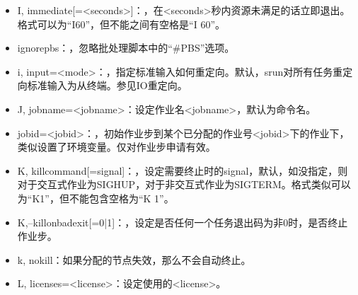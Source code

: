 \documentclass[a4paper,12pt,english]{sphinxmanual}
\begin{document}
\begin{itemize}
\begin{itemize}
\end{itemize}

\item {} 
\sphinxAtStartPar
\sphinxhyphen{}I, \sphinxhyphen{}\sphinxhyphen{}immediate{[}=<seconds>{]}：，在<seconds>秒内资源未满足的话立即退出。格式可以为“\sphinxhyphen{}I60”，但不能之间有空格是“\sphinxhyphen{}I 60”。

\item {} 
\sphinxAtStartPar
\sphinxhyphen{}\sphinxhyphen{}ignore\sphinxhyphen{}pbs：，忽略批处理脚本中的“\#PBS”选项。

\item {} 
\sphinxAtStartPar
\sphinxhyphen{}i, \sphinxhyphen{}\sphinxhyphen{}input=<mode>：，指定标准输入如何重定向。默认，srun对所有任务重定向标准输入为从终端。参见IO重定向。

\item {} 
\sphinxAtStartPar
\sphinxhyphen{}J, \sphinxhyphen{}\sphinxhyphen{}job\sphinxhyphen{}name=<jobname>：设定作业名<jobname>，默认为命令名。

\item {} 
\sphinxAtStartPar
\sphinxhyphen{}\sphinxhyphen{}jobid=<jobid>：，初始作业步到某个已分配的作业号<jobid>下的作业下，类似设置了环境变量。仅对作业步申请有效。

\item {} 
\sphinxAtStartPar
\sphinxhyphen{}K, \sphinxhyphen{}\sphinxhyphen{}kill\sphinxhyphen{}command{[}=signal{]}：，设定需要终止时的signal，默认，如没指定，则对于交互式作业为SIGHUP，对于非交互式作业为SIGTERM。格式类似可以为“\sphinxhyphen{}K1”，但不能包含空格为“\sphinxhyphen{}K 1”。

\item {} 
\sphinxAtStartPar
\sphinxhyphen{}K,–kill\sphinxhyphen{}on\sphinxhyphen{}bad\sphinxhyphen{}exit{[}=0|1{]}：，设定是否任何一个任务退出码为非0时，是否终止作业步。

\item {} 
\sphinxAtStartPar
\sphinxhyphen{}k, \sphinxhyphen{}\sphinxhyphen{}no\sphinxhyphen{}kill：如果分配的节点失效，那么不会自动终止。

\item {} 
\sphinxAtStartPar
\sphinxhyphen{}L, \sphinxhyphen{}\sphinxhyphen{}licenses=<license>：设定使用的<license>。


\end{itemize}
\end{document}
